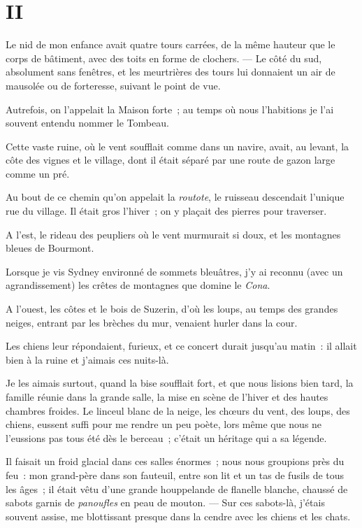 \documentclass[french,twoside]{book} %
\newcommand\chapteropen{} %
\newcommand\chaptercont{} %
\begin{document}
\chapteropen
 \chapter[{II}]{II}
\label{p1.2}

\chaptercont
\noindent Le nid de mon enfance avait quatre tours carrées, de la même hauteur que le corps de bâtiment, avec des toits en forme de clochers. — Le côté du sud, absolument sans fenêtres, et les meurtrières des tours lui donnaient un air de mausolée ou de forteresse, suivant le point de vue.\par
Autrefois, on l’appelait la Maison forte ; au temps où nous l’habitions je l’ai souvent entendu nommer le Tombeau.\par
Cette vaste ruine, où le vent soufflait comme dans un navire, avait, au levant, la côte des vignes et le village, dont il était séparé par une route de gazon large comme un pré.\par
Au bout de ce chemin qu’on appelait la \emph{routote}, le ruisseau descendait l’unique rue du village. Il était gros l’hiver ; on y plaçait des pierres pour traverser.\par
A l’est, le rideau des peupliers où le vent murmurait  si doux, et les montagnes bleues de Bourmont.\par
Lorsque je vis Sydney environné de sommets bleuâtres, j’y ai reconnu (avec un agrandissement) les crêtes de montagnes que domine le \emph{Cona}.\par
A l’ouest, les côtes et le bois de Suzerin, d’où les loups, au temps des grandes neiges, entrant par les brèches du mur, venaient hurler dans la cour.\par
Les chiens leur répondaient, furieux, et ce concert durait jusqu’au matin : il allait bien à la ruine et j’aimais ces nuits-là.\par
Je les aimais surtout, quand la bise soufflait fort, et que nous lisions bien tard, la famille réunie dans la grande salle, la mise en scène de l’hiver et des hautes chambres froides. Le linceul blanc de la neige, les chœurs du vent, des loups, des chiens, eussent suffi pour me rendre un peu poète, lors même que nous ne l’eussions pas tous été dès le berceau ; c’était un héritage qui a sa légende.\par
Il faisait un froid glacial dans ces salles énormes ; nous nous groupions près du feu : mon grand-père dans son fauteuil, entre son lit et un tas de fusils de tous les âges ; il était vêtu d’une grande houppelande de flanelle blanche, chaussé de  sabots garnis de \emph{panoufles} en peau de mouton. — Sur ces sabots-là, j’étais souvent assise, me blottissant presque dans la cendre avec les chiens et les chats.\par
\end{document}
